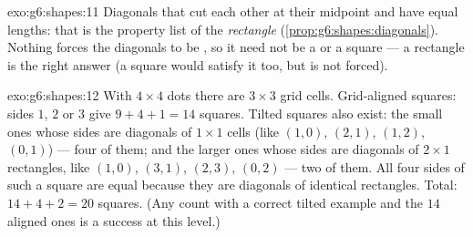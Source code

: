\begin{solution}{exo:g6:shapes:11}
Diagonals that cut each other at their midpoint and have equal lengths:
that is the property list of the \emph{rectangle}
(\cref{prop:g6:shapes:diagonals}). Nothing forces the diagonals to be
, so it need not be a  or a square --- a rectangle
is the right answer (a square would satisfy it too, but is not
forced).
\end{solution}

\begin{solution}{exo:g6:shapes:12}
With $4 \times 4$ dots there are $3 \times 3$ grid cells.
Grid-aligned squares: sides $1$, $2$ or $3$ give $9 + 4 + 1 = 14$
squares. Tilted squares also exist: the small ones whose sides are
diagonals of $1 \times 1$ cells (like $(1,0)$, $(2,1)$, $(1,2)$,
$(0,1)$) --- four of them; and the larger ones whose sides are
diagonals of $2 \times 1$ rectangles, like $(1,0)$, $(3,1)$, $(2,3)$,
$(0,2)$ --- two of them. All four sides of such a square are equal
because they are diagonals of identical rectangles. Total:
$14 + 4 + 2 = 20$ squares. (Any count with a correct tilted example
and the $14$ aligned ones is a success at this level.)
\end{solution}

